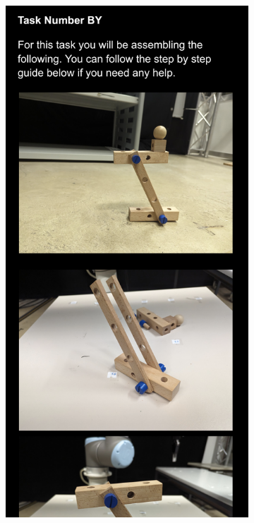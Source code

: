\begin{figure}[h]
    \centering
    \begin{subfigure}[b]{0.45\columnwidth}
        \includegraphics[width=\textwidth]{images/sts.png}

\end{subfigure}
\end{figure}
